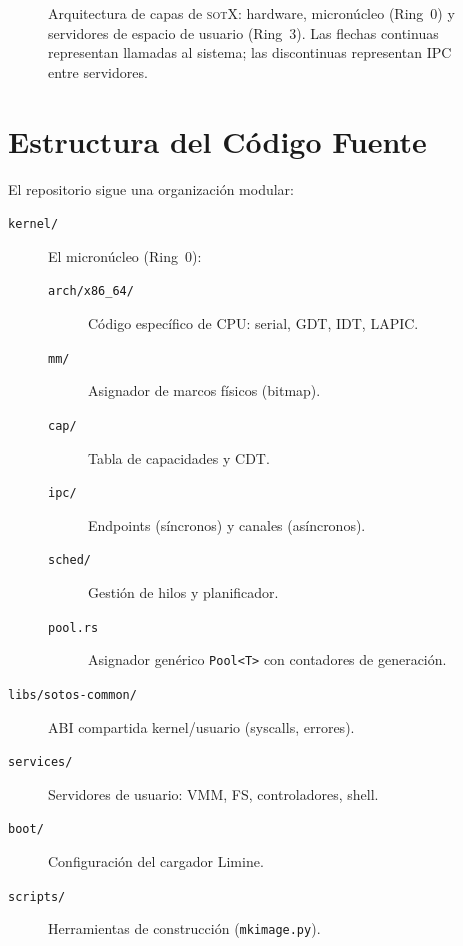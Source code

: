 \documentclass[11pt,twoside,openright]{book}
\theoremstyle{definition}
\theoremstyle{plain}
\theoremstyle{remark}
\newcommand{\sotos}{\textsc{sotX}}
\begin{document}
\begin{figure}[ht]
\caption{Arquitectura de capas de \sotos{}: hardware, micronúcleo (Ring~0) y
servidores de espacio de usuario (Ring~3). Las flechas continuas representan
llamadas al sistema; las discontinuas representan IPC entre servidores.}
\label{fig:architecture}
\end{figure}

\section{Estructura del Código Fuente}

El repositorio sigue una organización modular:

\begin{description}
    \item[\texttt{kernel/}] El micronúcleo (Ring~0):
    \begin{description}
        \item[\texttt{arch/x86\_64/}] Código específico de CPU: serial, GDT, IDT, LAPIC.
        \item[\texttt{mm/}] Asignador de marcos físicos (bitmap).
        \item[\texttt{cap/}] Tabla de capacidades y CDT.
        \item[\texttt{ipc/}] Endpoints (síncronos) y canales (asíncronos).
        \item[\texttt{sched/}] Gestión de hilos y planificador.
        \item[\texttt{pool.rs}] Asignador genérico \texttt{Pool<T>} con contadores de generación.
    \end{description}
    \item[\texttt{libs/sotos-common/}] ABI compartida kernel/usuario (syscalls, errores).
    \item[\texttt{services/}] Servidores de usuario: VMM, FS, controladores, shell.
    \item[\texttt{boot/}] Configuración del cargador Limine.
    \item[\texttt{scripts/}] Herramientas de construcción (\texttt{mkimage.py}).
\end{description}
\end{document}
